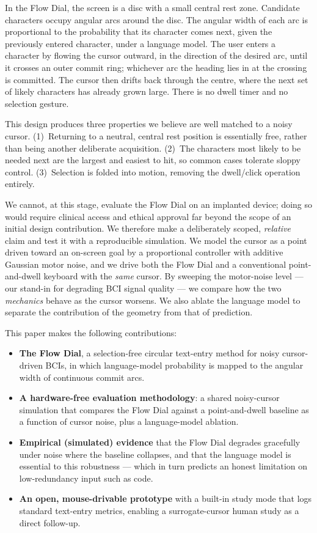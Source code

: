 \documentclass[manuscript,review,anonymous]{acmart}
\begin{document}
In the Flow Dial, the screen is a disc with a small central rest zone. Candidate
characters occupy angular arcs around the disc. The angular width of each arc is
proportional to the probability that its character comes next, given the
previously entered character, under a language model. The user enters a
character by flowing the cursor outward, in the direction of the desired arc,
until it crosses an outer commit ring; whichever arc the heading lies in at the
crossing is committed. The cursor then drifts back through the centre, where the
next set of likely characters has already grown large. There is no dwell timer
and no selection gesture.

This design produces three properties we believe are well matched to a noisy
cursor. (1)~Returning to a neutral, central rest position is essentially free,
rather than being another deliberate acquisition. (2)~The characters most likely
to be needed next are the largest and easiest to hit, so common cases tolerate
sloppy control. (3)~Selection is folded into motion, removing the dwell/click
operation entirely.

We cannot, at this stage, evaluate the Flow Dial on an implanted device; doing so
would require clinical access and ethical approval far beyond the scope of an
initial design contribution. We therefore make a deliberately scoped,
\emph{relative} claim and test it with a reproducible simulation. We model the
cursor as a point driven toward an on-screen goal by a proportional controller
with additive Gaussian motor noise, and we drive both the Flow Dial and a
conventional point-and-dwell keyboard with the \emph{same} cursor. By sweeping
the motor-noise level --- our stand-in for degrading BCI signal quality --- we
compare how the two \emph{mechanics} behave as the cursor worsens. We also ablate
the language model to separate the contribution of the geometry from that of
prediction.

This paper makes the following contributions:
\begin{itemize}
\item \textbf{The Flow Dial}, a selection-free circular text-entry method for
  noisy cursor-driven BCIs, in which language-model probability is mapped to the
  angular width of continuous commit arcs.
\item \textbf{A hardware-free evaluation methodology}: a shared noisy-cursor
  simulation that compares the Flow Dial against a point-and-dwell baseline as a
  function of cursor noise, plus a language-model ablation.
\item \textbf{Empirical (simulated) evidence} that the Flow Dial degrades
  gracefully under noise where the baseline collapses, and that the language
  model is essential to this robustness --- which in turn predicts an honest
  limitation on low-redundancy input such as code.
\item \textbf{An open, mouse-drivable prototype} with a built-in study mode that
  logs standard text-entry metrics, enabling a surrogate-cursor human study as a
  direct follow-up.
\end{itemize}
\end{document}
